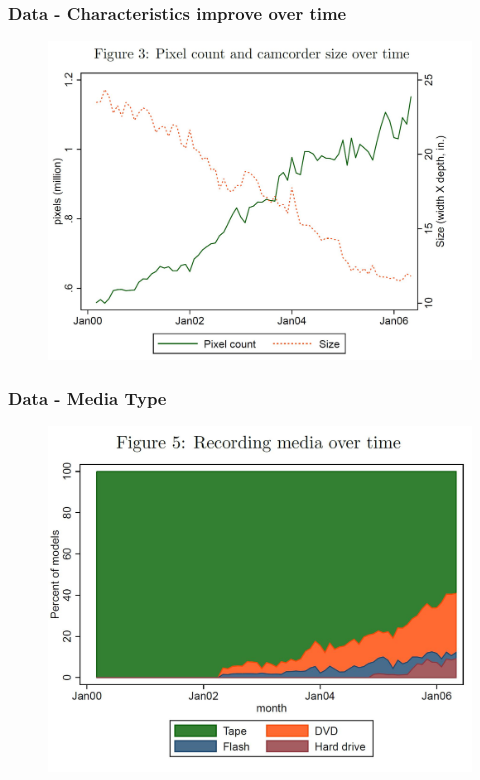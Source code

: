 \documentclass{beamer}
\theoremstyle{definition}
\begin{document}
\begin{frame}
  \frametitle{Data - Characteristics improve over time}

  \begin{figure}
    \includegraphics[width=\linewidth]{3.JPG}
  \end{figure}
\end{frame}

\begin{frame}
  \frametitle{Data - Media Type}

  \begin{figure}
    \includegraphics[width=\linewidth]{5.JPG}
  \end{figure}
\end{frame}
\end{document}
